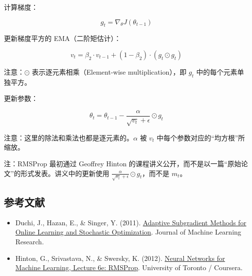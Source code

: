 计算梯度：

\[
g_t = \nabla_\theta J(\theta_{t-1})
\]

更新梯度平方的 EMA（二阶矩估计）：

\[
v_t = \beta_2 \cdot v_{t-1} + (1-\beta_2)\cdot (g_t \odot g_t)
\]

注意：\(\odot\) 表示逐元素相乘（Element-wise multiplication），即 \(g_t\) 中的每个元素单独平方。

更新参数：

\[
\theta_t = \theta_{t-1} - \frac{\alpha}{\sqrt{v_t}+\epsilon}\odot g_t
\]

注意：这里的除法和乘法也都是逐元素的。\(\alpha\) 被 \(v_t\) 中每个参数对应的``均方根''所缩放。

注：RMSProp 最初通过 Geoffrey Hinton 的课程讲义公开，而不是以一篇``原始论文''的形式发表。讲义中的更新使用 \(\frac{\alpha}{\sqrt{v_t}+\epsilon}\odot g_t\)，而不是 \(m_t\)。

\FloatBarrier
{}
\hypertarget{ux53c2ux8003ux6587ux732e-27}{%
\subsection{参考文献}\label{ux53c2ux8003ux6587ux732e-27}}

\vspace{0.25em}
\begin{itemize}
\tightlist
\item
  Duchi, J., Hazan, E., \& Singer, Y. (2011). \href{https://jmlr.org/papers/v12/duchi11a.html}{Adaptive Subgradient Methods for Online Learning and Stochastic Optimization}. Journal of Machine Learning Research.
\item
  Hinton, G., Srivastava, N., \& Swersky, K. (2012). \href{https://www.cs.toronto.edu/~tijmen/csc321/slides/lecture_slides_lec6.pdf}{Neural Networks for Machine Learning, Lecture 6e: RMSProp}. University of Toronto / Coursera.
\end{itemize}

\clearpage
